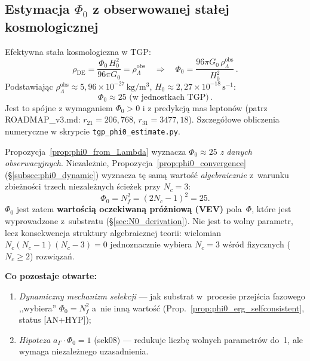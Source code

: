 \subsection{Estymacja \texorpdfstring{$\Phi_0$}{Φ₀} z obserwowanej stałej kosmologicznej}
\label{subsec:phi0_estimate}

\begin{propozycja}
\label{prop:phi0_from_Lambda}
Efektywna stała kosmologiczna w TGP:
\begin{equation}
  \rho_\mathrm{DE} = \frac{\Phi_0\,H_0^2}{96\pi G_0}
  = \rho_\Lambda^\mathrm{obs}
  \quad\Longrightarrow\quad
  \Phi_0 = \frac{96\pi G_0\,\rho_\Lambda^\mathrm{obs}}{H_0^2}\,.
  \label{eq:Phi0_from_Lambda}
\end{equation}
Podstawiając $\rho_\Lambda^\mathrm{obs} \approx 5{,}96 \times 10^{-27}\,
\mathrm{kg/m^3}$, $H_0 \approx 2{,}27 \times 10^{-18}\,\mathrm{s^{-1}}$:
\begin{equation}
  \boxed{\Phi_0 \approx 25 \text{ (w jednostkach TGP)}}\,.
\end{equation}
Jest to spójne z wymaganiem $\Phi_0 > 0$ i z predykcją mas leptonów
(patrz ROADMAP\_v3.md: $r_{21} = 206{,}768$, $r_{31} = 3477{,}18$).
Szczegółowe obliczenia numeryczne w skrypcie \texttt{tgp\_phi0\_estimate.py}.
\end{propozycja}

\begin{uwaga}
\label{rem:phi0_epistemology}
Propozycja~\ref{prop:phi0_from_Lambda} wyznacza $\Phi_0 \approx 25$
\emph{z danych obserwacyjnych}.
Niezale\.znie, Propozycja~\ref{prop:phi0_convergence}
(\S\ref{subsec:phi0_dynamic}) wyznacza t\k{e} sam\k{a} warto\'s\'c
\emph{algebraicznie} z~warunku zbieżności trzech niezależnych ścieżek
przy $N_c = 3$:
\begin{equation}
  \Phi_0 = N_f^2 = (2N_c - 1)^2 = 25.
\end{equation}
$\Phi_0$ jest zatem \textbf{wartością oczekiwaną próżniową (VEV)}
pola~$\Phi$, które jest wyprowadzone z~substratu (\S\ref{sec:N0_derivation}).
Nie jest to wolny parametr, lecz konsekwencja struktury algebraicznej
teorii: wielomian $N_c(N_c{-}1)(N_c{-}3) = 0$ jednoznacznie wybiera
$N_c = 3$ w\'sr\'od fizycznych ($N_c \ge 2$) rozwiązań.

\medskip\noindent
\textbf{Co pozostaje otwarte:}
\begin{enumerate}[nosep]
  \item \emph{Dynamiczny mechanizm selekcji} --- jak substrat
    w~procesie przej\'scia fazowego ,,wybiera'' $\Phi_0 = N_f^2$
    a~nie inn\k{a} warto\'s\'c (Prop.~\ref{prop:phi0_erg_selfconsistent},
    status [AN+HYP]);
  \item \emph{Hipoteza $a_\Gamma \cdot \Phi_0 = 1$} (sek08) ---
    redukuje liczb\k{e} wolnych parametr\'ow do~1, ale wymaga
    niezale\.znego uzasadnienia.
\end{enumerate}
\end{uwaga}

